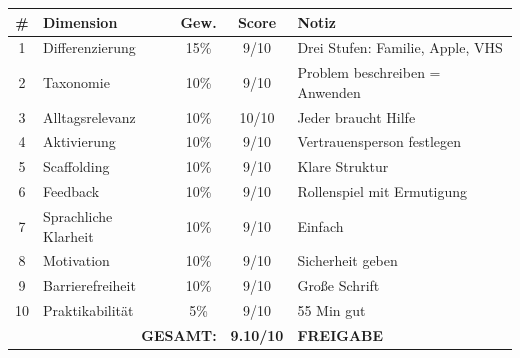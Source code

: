 \documentclass[11pt,a4paper]{article}
\begin{document}
\begin{scorebox}
\begin{tabular}{|c|l|c|c|p{3.5cm}|}
\hline
\# & Dimension & Gew. & Score & Notiz \\
\hline
1 & Differenzierung & 15\% & 9/10 & Drei Stufen: Familie, Apple, VHS \\
2 & Taxonomie & 10\% & 9/10 & Problem beschreiben = Anwenden \\
3 & Alltagsrelevanz & 10\% & 10/10 & Jeder braucht Hilfe \\
4 & Aktivierung & 10\% & 9/10 & Vertrauensperson festlegen \\
5 & Scaffolding & 10\% & 9/10 & Klare Struktur \\
6 & Feedback & 10\% & 9/10 & Rollenspiel mit Ermutigung \\
7 & Sprachliche Klarheit & 10\% & 9/10 & Einfach \\
8 & Motivation & 10\% & 9/10 & Sicherheit geben \\
9 & Barrierefreiheit & 10\% & 9/10 & Große Schrift \\
10 & Praktikabilität & 5\% & 9/10 & 55 Min gut \\
\hline
\multicolumn{3}{|r|}{\textbf{GESAMT:}} & \textbf{9.10/10} & \textcolor{successgreen}{\textbf{FREIGABE}} \\
\hline
\end{tabular}
\end{scorebox}
\end{document}
